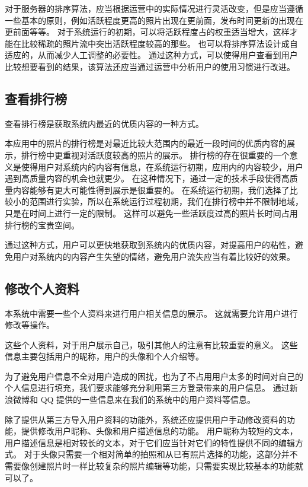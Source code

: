 对于服务器的排序算法，应当根据运营中的实际情况进行灵活改变，但是应当遵循一些基本的原则，例如活跃程度更高的照片出现在更前面，发布时间更新的出现在更前面等等。
对于系统运行的初期，可以将活跃程度占的权重适当增大，这样才能在比较稀疏的照片流中突出活跃程度较高的那些。
也可以将排序算法设计成自适应的，从而减少人工调整的必要性。
通过这种方式，可以使得用户查看到用户比较想要看到的结果，该算法还应当通过运营中分析用户的使用习惯进行改进。

\subsection{查看排行榜}

查看排行榜是获取系统内最近的优质内容的一种方式。

本应用中的照片的排行榜是对最近比较大范围内的最近一段时间的优质内容的展示，排行榜中更重视对活跃度较高的照片的展示。
排行榜的存在很重要的一个意义是使得用户对系统内的内容有信息，在系统运行初期，应用内的内容较少，用户遇到高质量内容的机会也就更少。
在这种情况下，通过一定的技术手段使得高质量内容能够有更大可能性得到展示是很重要的。
在系统运行初期，我们选择了比较小的范围进行实验，所以在系统运行过程初期，我们在排行榜中并不限制地域，只是在时间上进行一定的限制。
这样可以避免一些活跃度过高的照片长时间占用排行榜的宝贵空间。

通过这种方式，用户可以更快地获取到系统内的优质内容，对提高用户的粘性，避免用户对系统内的内容产生失望的情绪，避免用户流失应当有着比较好的效果。

\subsection{修改个人资料}

本系统中需要一些个人资料来进行用户相关信息的展示。
这就需要允许用户进行修改等操作。

这些个人资料，对于用户展示自己，吸引其他人的注意有比较重要的意义。
这些信息主要包括用户的昵称，用户的头像和个人介绍等。

为了避免用户信息不全对用户造成的困扰，也为了不占用用户太多的时间对自己的个人信息进行填充，我们要求能够充分利用第三方登录带来的用户信息。
通过新浪微博和 QQ 提供的一些信息来在我们的系统中的用户资料等信息。

除了提供从第三方导入用户资料的功能外，系统还应提供用户手动修改资料的功能，提供修改用户昵称、头像和用户描述信息的功能。
用户昵称为较短的文本，用户描述信息是相对较长的文本，对于它们应当针对它们的特性提供不同的编辑方式。
对于头像只需要一个相对简单的拍照和从已有照片选择的功能，这部分并不需要像创建照片时一样比较复杂的照片编辑等功能，只需要实现比较基本的功能就可以了。

